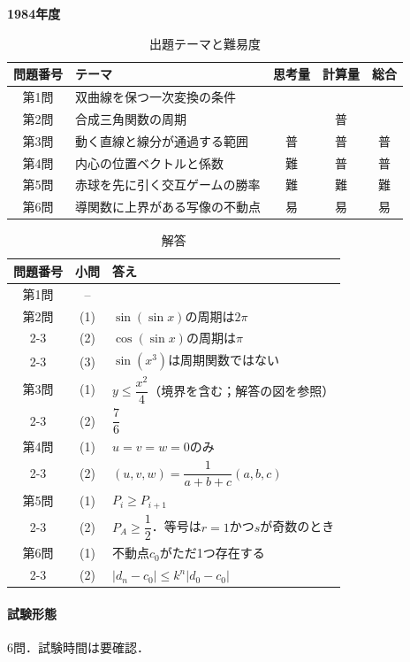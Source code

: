 \documentclass[../../main.tex]{subfiles}
\begin{document}
\begin{center}
  {\fontsize{48pt}{58pt}\selectfont \textbf{1984}\normalsize\textbf{年度}}
\end{center}

\begin{table}[htb]
  \centering
  \caption{出題テーマと難易度}
  \begin{tabular}{|c|p{6.2cm}|c|c|c|}
    \hline
    \textbf{問題番号} & \textbf{テーマ} & \textbf{思考量} & \textbf{計算量} & \textbf{総合} \\
    \hline
    第1問 & 双曲線を保つ一次変換の条件 &  &  &  \\
    \hline
    第2問 & 合成三角関数の周期 &  & 普 &  \\
    \hline
    第3問 & 動く直線と線分が通過する範囲 & 普 & 普 & 普 \\
    \hline
    第4問 & 内心の位置ベクトルと係数 & 難 & 普 & 普 \\
    \hline
    第5問 & 赤球を先に引く交互ゲームの勝率 & 難 & 難 & 難 \\
    \hline
    第6問 & 導関数に上界がある写像の不動点 & 易 & 易 & 易 \\
    \hline
  \end{tabular}
\end{table}

\begin{table}[htb]
  \centering
  \caption{解答}
  \renewcommand{\arraystretch}{1.4}
  \begin{tabular}{|c|c|p{9cm}|}
    \hline
    \textbf{問題番号} & \textbf{小問} & \textbf{答え} \\
    \hline
    第1問 & -- &  \\
    \hline
    第2問 & (1) & $\sin(\sin x)$の周期は$2\pi$ \\
    \cline{2-3}
    & (2) & $\cos(\sin x)$の周期は$\pi$ \\
    \cline{2-3}
    & (3) & $\sin(x^3)$は周期関数ではない \\
    \hline
    第3問 & (1) & $y\le\dfrac{x^2}{4}$（境界を含む；解答の図を参照） \\
    \cline{2-3}
    & (2) & $\dfrac{7}{6}$ \\
    \hline
    第4問 & (1) & $u=v=w=0$のみ \\
    \cline{2-3}
    & (2) & $(u,v,w)=\dfrac{1}{a+b+c}(a,b,c)$ \\
    \hline
    第5問 & (1) & $P_i\ge P_{i+1}$ \\
    \cline{2-3}
    & (2) & $P_A\ge\dfrac{1}{2}$．等号は$r=1$かつ$s$が奇数のとき \\
    \hline
    第6問 & (1) & 不動点$c_0$がただ1つ存在する \\
    \cline{2-3}
    & (2) & $|d_n-c_0|\le k^n|d_0-c_0|$ \\
    \hline
  \end{tabular}
\end{table}

\paragraph{試験形態}
6問．試験時間は要確認．
\end{document}
